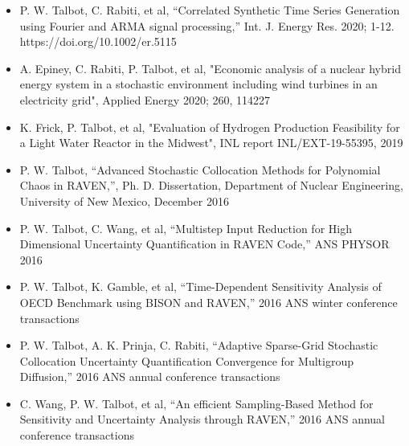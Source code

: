 \documentclass{res}
\begin{document}
\begin{resume}
\begin{itemize}
  \item P. W. Talbot, C. Rabiti, et al, ``Correlated Synthetic Time Series Generation using Fourier and ARMA signal processing,''
    Int. J. Energy Res. 2020; 1-12. \\https://doi.org/10.1002/er.5115
  \item A. Epiney, C. Rabiti, P. Talbot, et al, "Economic analysis of a nuclear hybrid energy system in a stochastic environment including wind turbines in an electricity grid",
    Applied Energy 2020; 260, 114227
  \item K. Frick, P. Talbot, et al, "Evaluation of Hydrogen Production Feasibility for a Light Water Reactor
	  in the Midwest", INL report INL/EXT-19-55395, 2019
  \item P. W. Talbot, ``Advanced Stochastic Collocation Methods for Polynomial Chaos in RAVEN,'', Ph. D.
    Dissertation, Department of Nuclear Engineering, University of New Mexico, December 2016
  \item P. W. Talbot, C. Wang, et al, ``Multistep Input Reduction for High
    Dimensional Uncertainty Quantification in RAVEN Code,'' ANS PHYSOR 2016
  \item P. W. Talbot, K. Gamble, et al, ``Time-Dependent Sensitivity Analysis of OECD Benchmark using BISON
    and RAVEN,'' 2016 ANS winter conference transactions
  \item P. W. Talbot, A. K. Prinja, C. Rabiti, ``Adaptive Sparse-Grid Stochastic Collocation Uncertainty
    Quantification Convergence for Multigroup Diffusion,'' 2016 ANS annual conference transactions
  \item C. Wang, P. W. Talbot, et al, ``An efficient Sampling-Based Method for Sensitivity and
    Uncertainty Analysis through RAVEN,'' 2016 ANS annual conference transactions

\end{itemize}
\end{resume}
\end{document}
